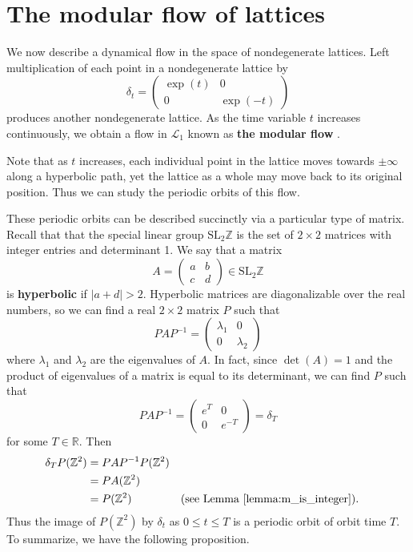 \documentclass[12pt,twoside]{reedthesis}
\theoremstyle{definition}
\newcommand{\Z}{\mathbb{Z}}
\newcommand{\R}{\mathbb{R}}
\newcommand{\LS}{\mathcal{L}}
\newcommand{\SLZ}{\mathrm{SL}_2{\Z}}
\newcommand{\defnphrase}[1]{\textbf{#1}}
\begin{document}
\section{The modular flow of lattices}\label{subsec:lattice_flow}

We now describe a dynamical flow in the space of nondegenerate lattices.
Left multiplication of each point in a nondegenerate lattice by
\begin{equation}\label{eq:delta_t}
  \delta_t = \begin{pmatrix}
    \exp(t) & 0 \\
    0 & \exp(-t)
  \end{pmatrix}
\end{equation}
produces another nondegenerate lattice.
As the time variable $t$ increases continuously, we obtain a flow in $\LS_1$ known as \defnphrase{the modular flow} \cite{ghys2007} \cite{touristguide} \cite{ncatcafe}.
  
Note that as $t$ increases, each individual point in the lattice moves towards $\pm \infty$ along a hyperbolic path, yet the lattice as a whole may move back to its original position.
Thus we can study the periodic orbits of this flow. 

These periodic orbits can be described succinctly via a particular type of matrix.
Recall that that the special linear group $\SLZ$ is the set of $2 \times 2$ matrices with integer entries and determinant 1.
We say that a matrix
\begin{equation*}
  A = \begin{pmatrix}
    a & b \\
    c & d
  \end{pmatrix} \in \SLZ
\end{equation*}
is \defnphrase{hyperbolic} if $|a + d| > 2$.
Hyperbolic matrices are diagonalizable over the real numbers, so we can find a real $2 \times 2$ matrix $P$ such that
\begin{equation*}
  PAP^{-1} = \begin{pmatrix}
    \lambda_1 & 0 \\
    0 & \lambda_2
  \end{pmatrix}
\end{equation*}
where $\lambda_1$ and $\lambda_2$ are the eigenvalues of $A$.
In fact, since $\det(A) = 1$ and the product of eigenvalues of a matrix is equal to its determinant, we can find $P$ such that
\begin{equation*}
  PAP^{-1} = \begin{pmatrix}
    e^T & 0 \\
    0 & e^{-T}
  \end{pmatrix} = \delta_T
\end{equation*}
for some $T \in \R$.
Then
\begin{align*}
  \delta_{T}P(\Z^2) &= PAP^{-1} P(\Z^2) \\
  &= PA(\Z^2) \\
  &= P(\Z^2) && \text{(see Lemma~\ref{lemma:m_is_integer}).}
\end{align*}
Thus the image of $P(\Z^2)$ by $\delta_t$ as $0 \leq t \leq T$ is a periodic orbit of orbit time $T$.
To summarize, we have the following proposition.
\end{document}
